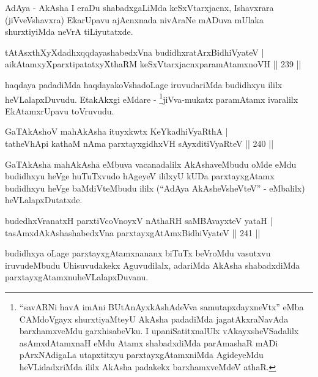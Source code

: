 \begin{artha}
AdAya - AkAsha I eraDu shabadxgaLiMda keSxVtarxjacnx, Ishavxrara (jiVveVshavxra) EkarUpavu ajAcnxnada nivAraNe mADuva mUlaka shurxtiyiMda neVrA tiLiyutatxde.
\end{artha}

\begin{shl}
tAtAsxthXyXdadhxqqdayashabedxVna budidhxratArxBidhiVyateV |\\
aikAtamxyXparxtipatatxyXthaRM keSxVtarxjacnxparamAtamxnoVH \hfill || 239 ||
\end{shl}

\begin{artha}
haqdaya padadiMda haqdayakoVshadoLage iruvudariMda budidhxyu ililx 
heVLalapxDuvudu. EtakAkxgi eMdare - \footnote{``savARNi havA imAni BUtAnAyxkAshAdeVva samutapxdayxneVtx'' eMba 
CAMdoVgayx shurxtiyaMteyU AkAsha padadiMda jagatAkxraNavAda barxhamxveMdu garxhisabeVku. I upaniSatitxnalUlx vAkayxsheVSadalilx asAmxdAtamxnaH eMdu Atamx shabadxdiMda parAmashaR mADi pArxNAdigaLa utapxtitxyu parxtayxgAtamxniMda AgideyeMdu heVLidadxriMda ililx AkAsha padakekx barxhamxveMdeV athaR.}jiVva-mukatx paramAtamx ivaralilx EkAtamxrUpavu toVruvudu.
\end{artha}

\begin{shl}
GaTAkAshoV mahAkAsha ituyxkwtx KeYkadhiVyaRthA |\\
tatheVhApi kathaM nAma parxtayxgidhxVH sAyxditiVyaRteV \hfill || 240 ||
\end{shl}

\begin{artha}
GaTAkAsha mahAkAsha eMbuva vacanadalilx AkAshaveMbudu oMde eMdu budidhxyu heVge huTuTxvudo hAgeyeV ililxyU kUDa parxtayxgAtamx budidhxyu heVge baMdiVteMbudu ililx (``AdAya AkAsheVsheVteV'' - eMbalilx) heVLalapxDutatxde.
\end{artha}

\begin{shl}
budedhxVranatxH parxtiVcoV\s noyxV nAthaRH saMBAvayxteV yataH |\\
tasAmxdAkAshashabedxVna parxtayxgAtAmx\s BidhiVyateV \hfill || 241 ||
\end{shl}

\begin{artha}
budidhxya oLage parxtayxgAtamxnananx biTuTx beVroMdu vasutxvu iruvudeMbudu Uhisuvudakekx Aguvudilalx, adariMda AkAsha shabadxdiMda parxtayxgAtamxnu\break heVLalapxDuvanu.
\end{artha}


